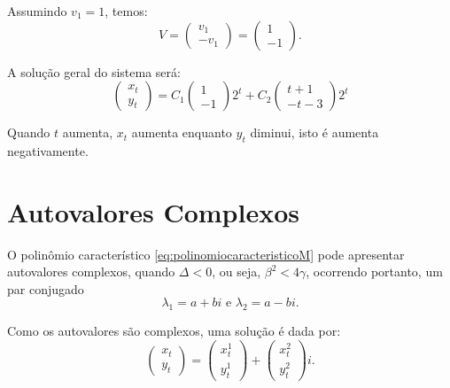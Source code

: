 Assumindo $v_1 = 1$, temos:
$$V =
\left(\begin{array}{r} v_1 \\ -v_1 \end{array}\right)
=
\left(\begin{array}{r} 1 \\ -1 \end{array}\right).
$$


A solução geral do sistema será:
$$
\left(\begin{array}{c} x_t \\ y_t \end{array}\right)
=
C_1 \left(\begin{array}{r} 1 \\ -1 \end{array}\right) 2^t
+
C_2 \left(\begin{array}{c}  t+1 \\ -t-3 \end{array}\right) 2^t
$$

Quando $t$ aumenta, $x_{t}$ aumenta enquanto $y_{t}$ diminui, isto é aumenta negativamente.


\section{Autovalores Complexos}

O polinômio característico \eqref{eq:polinomiocaracteristicoM} pode apresentar autovalores complexos, quando $\Delta < 0$, ou seja, $\beta^2 < 4\gamma$, ocorrendo portanto, um par conjugado
$$\lambda_{1} = a + bi \mbox{ e } \lambda_{2} = a - bi.$$

Como os autovalores são complexos, uma solução é dada por:
$$
\left(\begin{array}{c} x_t \\ y_t \end{array}\right)
= 
\left(\begin{array}{c} x_t^1 \\ y_t^1 \end{array}\right)
+ 
\left(\begin{array}{c} x_t^2 \\ y_t^2 \end{array}\right)i.
$$


